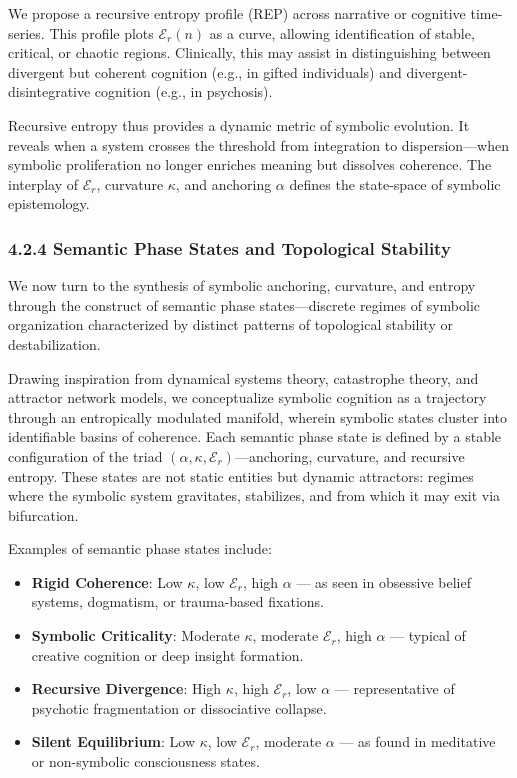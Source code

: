 We propose a recursive entropy profile (REP) across narrative or cognitive time-series. This profile plots $\mathcal{E}_r(n)$ as a curve, allowing identification of stable, critical, or chaotic regions. Clinically, this may assist in distinguishing between divergent but coherent cognition (e.g., in gifted individuals) and divergent-disintegrative cognition (e.g., in psychosis).

Recursive entropy thus provides a dynamic metric of symbolic evolution. It reveals when a system crosses the threshold from integration to dispersion—when symbolic proliferation no longer enriches meaning but dissolves coherence. The interplay of $\mathcal{E}_r$, curvature $\kappa$, and anchoring $\alpha$ defines the state-space of symbolic epistemology.

\subsubsection*{4.2.4 Semantic Phase States and Topological Stability}

We now turn to the synthesis of symbolic anchoring, curvature, and entropy through the construct of semantic phase states—discrete regimes of symbolic organization characterized by distinct patterns of topological stability or destabilization.

Drawing inspiration from dynamical systems theory, catastrophe theory, and attractor network models, we conceptualize symbolic cognition as a trajectory through an entropically modulated manifold, wherein symbolic states cluster into identifiable basins of coherence. Each semantic phase state is defined by a stable configuration of the triad $(\alpha, \kappa, \mathcal{E}_r)$—anchoring, curvature, and recursive entropy. These states are not static entities but dynamic attractors: regimes where the symbolic system gravitates, stabilizes, and from which it may exit via bifurcation.

Examples of semantic phase states include:
\begin{itemize}
\item \textbf{Rigid Coherence}: Low $\kappa$, low $\mathcal{E}_r$, high $\alpha$ — as seen in obsessive belief systems, dogmatism, or trauma-based fixations.
\item \textbf{Symbolic Criticality}: Moderate $\kappa$, moderate $\mathcal{E}_r$, high $\alpha$ — typical of creative cognition or deep insight formation.
\item \textbf{Recursive Divergence}: High $\kappa$, high $\mathcal{E}_r$, low $\alpha$ — representative of psychotic fragmentation or dissociative collapse.
\item \textbf{Silent Equilibrium}: Low $\kappa$, low $\mathcal{E}_r$, moderate $\alpha$ — as found in meditative or non-symbolic consciousness states.
\end{itemize}

